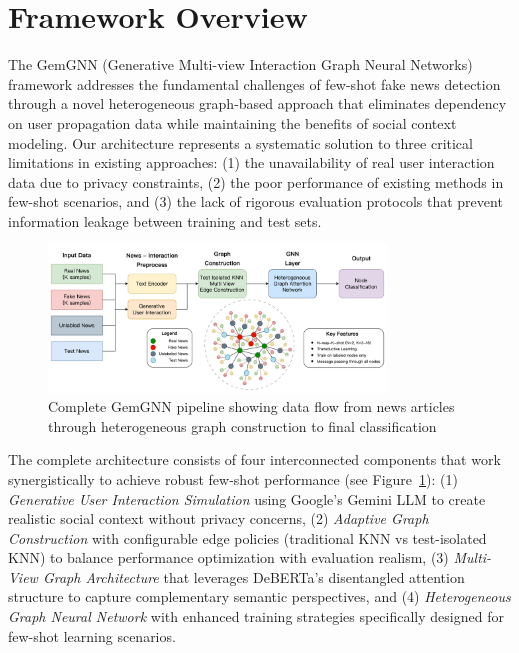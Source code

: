 \section{Framework Overview}

The GemGNN (Generative Multi-view Interaction Graph Neural Networks) framework addresses the fundamental challenges of few-shot fake news detection through a novel heterogeneous graph-based approach that eliminates dependency on user propagation data while maintaining the benefits of social context modeling. Our architecture represents a systematic solution to three critical limitations in existing approaches: (1) the unavailability of real user interaction data due to privacy constraints, (2) the poor performance of existing methods in few-shot scenarios, and (3) the lack of rigorous evaluation protocols that prevent information leakage between training and test sets.

\begin{figure}[h]
    \centering
    \includegraphics[width=0.8\textwidth]{context/methodology/fig/pipeline.png}
    \caption{Complete GemGNN pipeline showing data flow from news articles through heterogeneous graph construction to final classification}
    \label{fig:pipeline}
\end{figure}

The complete architecture consists of four interconnected components that work synergistically to achieve robust few-shot performance (see Figure~\ref{fig:pipeline}): (1) \emph{Generative User Interaction Simulation} using Google's Gemini LLM to create realistic social context without privacy concerns, (2) \emph{Adaptive Graph Construction} with configurable edge policies (traditional KNN vs test-isolated KNN) to balance performance optimization with evaluation realism, (3) \emph{Multi-View Graph Architecture} that leverages DeBERTa's disentangled attention structure to capture complementary semantic perspectives, and (4) \emph{Heterogeneous Graph Neural Network} with enhanced training strategies specifically designed for few-shot learning scenarios.

